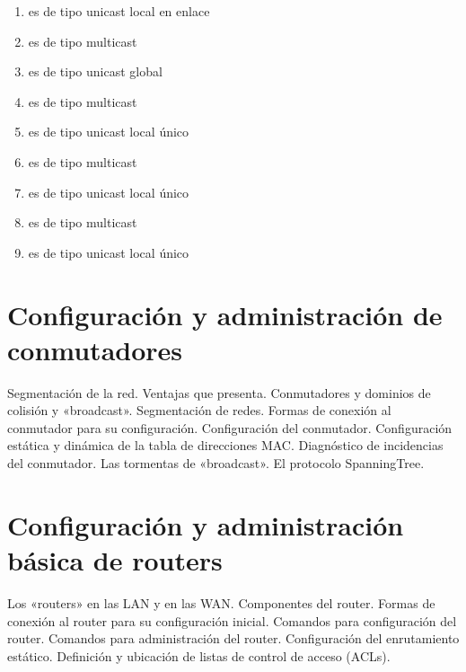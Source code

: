 \documentclass[letterpaper,10pt,spanish]{sphinxmanual}
\begin{document}
\begin{enumerate}
\item {} 
\sphinxAtStartPar
{} es de tipo unicast local en enlace

\item {} 
\sphinxAtStartPar
{} es de tipo multicast

\item {} 
\sphinxAtStartPar
{} es de tipo unicast global

\item {} 
\sphinxAtStartPar
{} es de tipo multicast

\item {} 
\sphinxAtStartPar
{} es de tipo unicast local único

\item {} 
\sphinxAtStartPar
{} es de tipo multicast

\item {} 
\sphinxAtStartPar
{} es de tipo unicast local único

\item {} 
\sphinxAtStartPar
{} es de tipo multicast

\item {} 
\sphinxAtStartPar
{} es de tipo unicast local único

\end{enumerate}


\chapter{Configuración y administración de conmutadores}
\label{\detokenize{t3_conmutadores/apuntes_t3:configuracion-y-administracion-de-conmutadores}}\label{\detokenize{t3_conmutadores/apuntes_t3::doc}}
\sphinxAtStartPar
Segmentación de la red.
Ventajas que presenta.
Conmutadores y dominios de colisión y  «broadcast».
Segmentación de redes.
Formas de conexión al conmutador para su configuración.
Configuración del conmutador.
Configuración estática y dinámica de la tabla de direcciones MAC.
Diagnóstico de incidencias del conmutador.
Las tormentas de «broadcast».
El protocolo Spanning\sphinxhyphen{}Tree.


\chapter{Configuración y administración básica de routers}
\label{\detokenize{t4_routers/apuntes_t4:configuracion-y-administracion-basica-de-routers}}\label{\detokenize{t4_routers/apuntes_t4::doc}}
\sphinxAtStartPar
Los «routers» en las LAN y en las WAN.
Componentes del router.
Formas de conexión al router para su configuración inicial.
Comandos para configuración del router.
Comandos para administración del router.
Configuración del enrutamiento estático.
Definición y ubicación de listas de control de acceso (ACLs).
\end{document}
